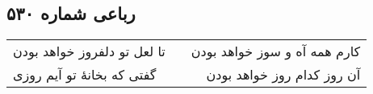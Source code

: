\begin{center}
\section*{رباعی شماره ۵۳۰}
\label{sec:sh530}
\begin{longtable}{l p{0.5cm} r}
تا لعل تو دلفروز خواهد بودن
&&
کارم همه آه و سوز خواهد بودن
\\
گفتی که بخانهٔ تو آیم روزی
&&
آن روز کدام روز خواهد بودن
\\
\end{longtable}
\end{center}
